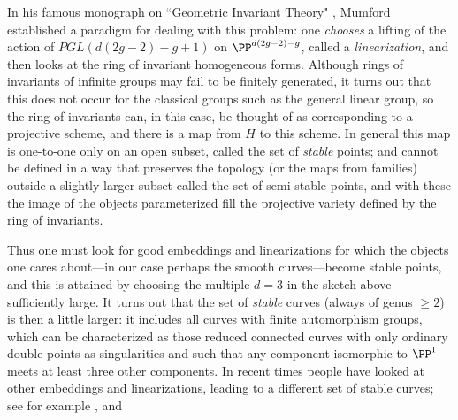 In his famous monograph on ``Geometric Invariant Theory" \cite{GIT}, Mumford established a paradigm for dealing with this problem: one \emph{chooses} a lifting of the action of $PGL(d(2g-2)-g+1)$ on $\PP^{d(2g-2)-g}$, called a \emph{linearization}, and then looks at the ring of invariant homogeneous forms. Although rings of invariants of infinite groups may fail to be finitely generated, it turns out that this does not occur for the classical groups such as the general linear group, so the ring of invariants can, in this case, be
thought of as corresponding to a projective scheme, and there is a map from $H$
to this scheme. In general this map is one-to-one only on an open subset, called the set of 
\emph{stable} points; and cannot be defined in a way that preserves the topology (or the maps from families) outside a slightly larger subset called the set of 
semi-stable points, and with these the image of the objects parameterized fill the projective variety
defined by the ring of invariants.


Thus one must look for good embeddings and linearizations for which the objects one cares about---in our case perhaps the smooth curves---become stable points, and this is attained by choosing the multiple $d=3$ in the sketch above sufficiently large. 
It turns out that the 
set of \emph{stable} curves (always of genus $\geq 2$) is then a little larger: it includes all curves with finite automorphism groups, which can be characterized as those reduced connected curves with only ordinary double points as singularities and such that any component isomorphic to $\PP^1$ meets at least three other components. In recent times people have looked at other embeddings and linearizations, leading to a different set of stable curves; see for example \cite{SchubertCompactification},\cite{Hassett1}
and \cite{Hassett2}


